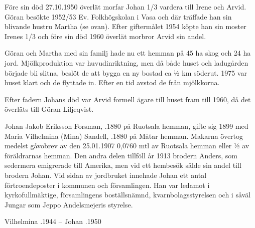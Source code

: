 Före sin död 27.10.1950 överlät morfar Johan 1/3 vardera till Irene och Arvid. Göran besökte 1952/53 Ev. Folkhögskolan i Vasa och där träffade han sin blivande hustru Martha (se ovan). Efter giftermålet 1954 köpte han sin moster Irenes 1/3 och före sin död 1960 överlät morbror Arvid sin andel.

Göran och Martha med sin familj hade nu ett hemman på 45 ha skog och 24 ha jord. Mjölkproduktion var huvudinriktning, men då både huset och ladugården började bli slitna, beslöt de att bygga en ny bostad ca ½ km söderut. 1975 var huset klart och de flyttade in. Efter en tid avstod de från mjölkkorna.


Efter fadern Johans död var Arvid formell ägare till huset fram till 1960, då det överläts till Göran Liljeqvist.


Johan Jakob Eriksson Forsman, .1880 på Ruotsala hemman, gifte sig 1899 med Maria Vilhelmina (Mina) Sandell, .1880 på Måtar hemman. Makarna övertog medelst gåvobrev av den 25.01.1907  0,0760 mtl av Ruotsala hemman eller ½ av föräldrarnas hemman. Den andra delen tillföll år 1913 brodern Anders, som sedermera emigrerade till Amerika, men vid ett hembesök sålde sin andel till brodern Johan.
Vid sidan av jordbruket innehade Johan ett antal förtroendeposter i kommunen och församlingen. Han var ledamot i kyrkofullmäktige, församlingens boställsnämnd, kvarnbolagsstyrelsen och i såväl Jungar som Jeppo Andelsmejeris styrelse.
\begin{jhchildren}
  \item {}
  \item {}
  \item {}
  \item {}
  \item {}
  \item {}
  \item {}
  \item {}
  \item {}
  \item {}
  \item {}
  \item {}
\end{jhchildren}
Vilhelmina .1944  --  Johan .1950


